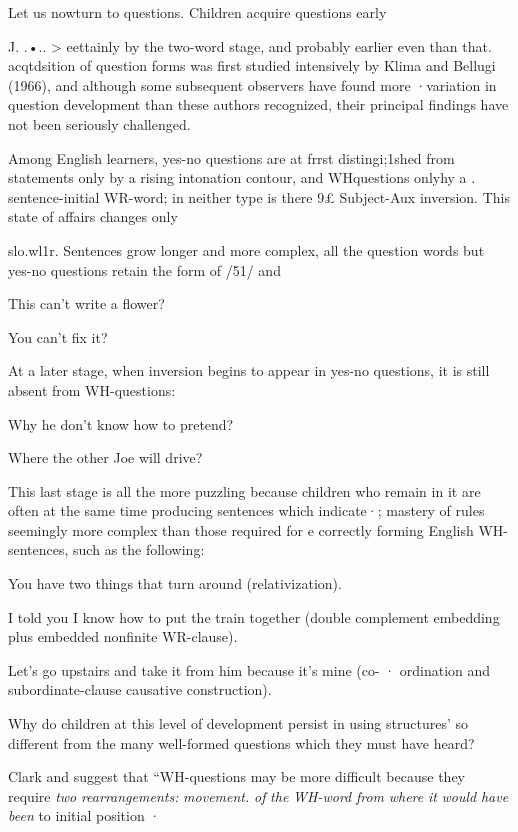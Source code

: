 Let us nowturn to questions. Children acquire questions early\-

J. .•.. {\textgreater} eettainly by the two-word stage, and probably earlier even than that. acqtdsition of question forms was first studied intensively by Klima and Bellugi (1966), and although some subsequent observers have found more ·variation in question development than these authors recognized, their principal findings have not been seriously challenged.

Among English learners, yes-no questions are at frrst distin\-gi;1shed from statements only by a rising intonation contour, and WH\-questions onlyhy a . sentence-initial WR-word; in neither type is there 9£ Subject-Aux inversion. This state of affairs changes only

slo.wl1r. Sentences grow longer and more complex, all the question
words but yes-no questions retain the form of /51/ and

\ea\label{ex:51}
 This can't write a flower? 
\z

\ea\label{ex:52}
 You can't fix it? 
\z

At a later stage, when inversion begins to appear in yes-no questions,   it is still absent from WH-questions:

\ea\label{ex:53}
 Why he don't know how to pretend? 
\z

\ea\label{ex:54}
 Where the other Joe will drive? 
\z

This last stage is all the more puzzling because children who remain in it are often at the same time producing sentences which indicate·; mastery of rules seemingly more complex than those required for e correctly forming English WH-sentences, such as the following:

\ea\label{ex:55}
 You have two things that turn around (relativization). 
\z

\ea\label{ex:56}
 I told you I know how to put the train together (double comple\-ment embedding plus embedded nonfinite WR-clause). 
\z

\ea\label{ex:57}
 Let's go upstairs and take it from him because it's mine (co- · ordination and subordinate-clause causative construction). 
\z

Why do children at this level of development persist in using structures' so different from the many well-formed questions which they must  have heard?

Clark and \citet[354]{Clark1977} suggest that ``WH-questions may be more difficult because they require \textit{two} \textit{rearrangements:} \textit{movement.} \textit{of} \textit{the} \textit{WH-word} \textit{from} \textit{where} \textit{it} \textit{would} \textit{have} \textit{been} to initial position ·

